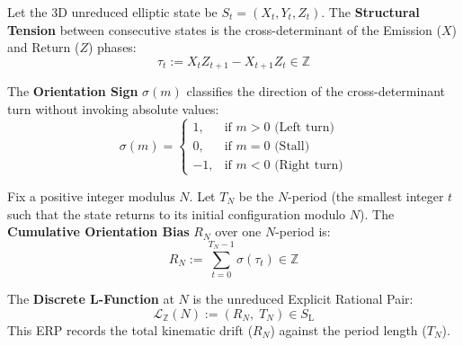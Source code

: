 \documentclass[11pt, letterpaper]{article}
\newcommand{\Z}{\mathbb{Z}}
\newcommand{\SL}{S_{\mathrm{L}}}
\begin{document}
\begin{definition}\label{def:tension_sign}
\begin{rsbox}
Let the 3D unreduced elliptic state be $S_t = (X_t, Y_t, Z_t)$.
The \textbf{Structural Tension} between consecutive states is the cross-determinant of the Emission ($X$) and Return ($Z$) phases:
\[ \tau_t := X_t Z_{t+1} - X_{t+1} Z_t \in \Z \]

The \textbf{Orientation Sign} $\sigma(m)$ classifies the direction of the cross-determinant turn without invoking absolute values:
\[
\sigma(m) = \begin{cases}
  1, & \text{if } m > 0 \text{ (Left turn)} \\
  0, & \text{if } m = 0 \text{ (Stall)} \\
 -1, & \text{if } m < 0 \text{ (Right turn)}
\end{cases}
\]
\end{rsbox}
\end{definition}

\begin{definition}\label{def:discrete_L}
\begin{rsbox}
Fix a positive integer modulus $N$. Let $T_N$ be the $N$-period (the smallest integer $t$ such that the state returns to its initial configuration modulo $N$).
The \textbf{Cumulative Orientation Bias} $R_N$ over one $N$-period is:
\[ R_N := \sum_{t=0}^{T_N-1} \sigma(\tau_t) \in \Z \]

The \textbf{Discrete L-Function} at $N$ is the unreduced Explicit Rational Pair:
\[ \mathcal{L}_{\Z}(N) := (R_N,\; T_N) \in \SL \]
This ERP records the total kinematic drift ($R_N$) against the period length ($T_N$).
\end{rsbox}
\end{definition}
\end{document}
